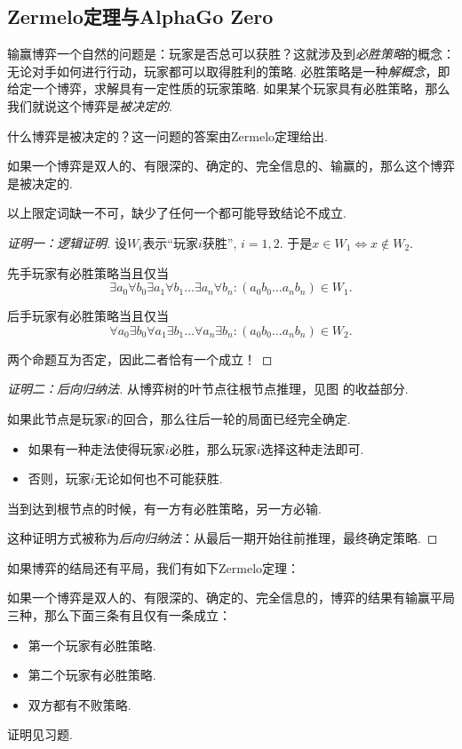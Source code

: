\subsection{Zermelo定理与AlphaGo Zero}

输赢博弈一个自然的问题是：玩家是否总可以获胜？这就涉及到\textit{必胜策略}的概念：无论对手如何进行行动，玩家都可以取得胜利的策略. 必胜策略是一种\textit{解概念}，即给定一个博弈，求解具有一定性质的玩家策略. 如果某个玩家具有必胜策略，那么我们就说这个博弈是\textit{被决定的}. 

什么博弈是被决定的？这一问题的答案由Zermelo定理给出.

\begin{theorem}\label{thm:zermelo}
如果一个博弈是双人的、有限深的、确定的、完全信息的、输赢的，那么这个博弈是被决定的.
\end{theorem}
以上限定词缺一不可，缺少了任何一个都可能导致结论不成立.

\begin{proof}[证明一：逻辑证明]
设$W_i$表示“玩家$i$获胜”, $i=1,2$. 于是$x\in W_1\iff x\not\in W_2$.

先手玩家有必胜策略当且仅当
\[\exists a_0\forall b_0\exists a_1\forall b_1\dots\exists a_n\forall b_n: (a_0b_0\dots a_nb_n)\in W_1.\]

后手玩家有必胜策略当且仅当
\[\forall a_0\exists b_0\forall a_1\exists b_1\dots\forall a_n\exists b_n: (a_0b_0\dots a_nb_n)\in W_2.\]

两个命题互为否定，因此二者恰有一个成立！
\end{proof}

\begin{proof}[证明二：后向归纳法]
从博弈树的叶节点往根节点推理，见图 的收益部分. 

如果此节点是玩家$i$的回合，那么往后一轮的局面已经完全确定.
\begin{itemize}
    \item 如果有一种走法使得玩家$i$必胜，那么玩家$i$选择这种走法即可.
    \item 否则，玩家$i$无论如何也不可能获胜.
\end{itemize}

当到达到根节点的时候，有一方有必胜策略，另一方必输.

这种证明方式被称为\textit{后向归纳法}：从最后一期开始往前推理，最终确定策略.
\end{proof}

如果博弈的结局还有平局，我们有如下Zermelo定理：
\begin{theorem}[有平局的Zermelo定理]\label{thm:zermelo-draw}
如果一个博弈是双人的、有限深的、确定的、完全信息的，博弈的结果有输赢平局三种，那么下面三条有且仅有一条成立：
\begin{itemize}
    \item 第一个玩家有必胜策略.
    \item 第二个玩家有必胜策略.
    \item 双方都有不败策略.
\end{itemize}
\end{theorem}
证明见习题. 

